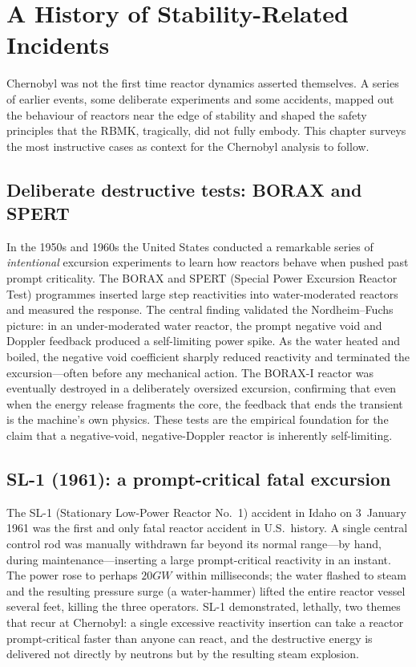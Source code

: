 \chapter{A History of Stability-Related Incidents}
\label{ch:history}

Chernobyl was not the first time reactor dynamics asserted themselves. A series of
earlier events, some deliberate experiments and some accidents, mapped out the
behaviour of reactors near the edge of stability and shaped the safety principles
that the RBMK, tragically, did not fully embody. This chapter surveys the most
instructive cases as context for the Chernobyl analysis to follow.

\section{Deliberate destructive tests: BORAX and SPERT}

In the 1950s and 1960s the United States conducted a remarkable series of
\emph{intentional} excursion experiments to learn how reactors behave when pushed
past prompt criticality. The BORAX and SPERT (Special Power Excursion Reactor
Test) programmes inserted large step reactivities into water-moderated reactors
and measured the response. The central finding validated the Nordheim--Fuchs
picture: in an under-moderated water reactor, the prompt negative void and Doppler
feedback produced a self-limiting power spike. As the water heated and boiled, the
negative void coefficient sharply reduced reactivity and terminated the
excursion---often before any mechanical action. The BORAX-I reactor was eventually
destroyed in a deliberately oversized excursion, confirming that even when the
energy release fragments the core, the feedback that ends the transient is the
machine's own physics. These tests are the empirical foundation for the claim that
a negative-void, negative-Doppler reactor is inherently self-limiting.

\section{SL-1 (1961): a prompt-critical fatal excursion}

The SL-1 (Stationary Low-Power Reactor No.~1) accident in Idaho on 3~January 1961
was the first and only fatal reactor accident in U.S.\ history. A single central
control rod was manually withdrawn far beyond its normal range---by hand, during
maintenance---inserting a large prompt-critical reactivity in an instant. The
power rose to perhaps $20\unit{GW}$ within milliseconds; the water flashed to steam
and the resulting pressure surge (a water-hammer) lifted the entire reactor vessel
several feet, killing the three operators. SL-1 demonstrated, lethally, two
themes that recur at Chernobyl: a single excessive reactivity insertion can take a
reactor prompt-critical faster than anyone can react, and the destructive energy
is delivered not directly by neutrons but by the resulting steam explosion.

